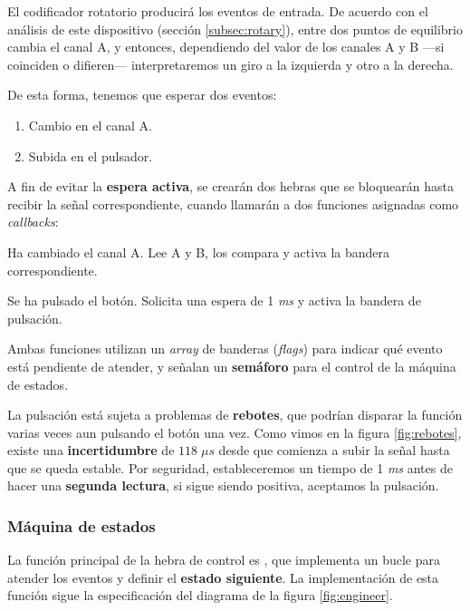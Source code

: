 El codificador rotatorio producirá los eventos de entrada. De acuerdo con el análisis de este dispositivo (sección \ref{subsec:rotary}), entre dos puntos de equilibrio cambia el canal A, y entonces, dependiendo del valor de los canales A y B ---si coinciden o difieren--- interpretaremos un giro a la izquierda y otro a la derecha.

De esta forma, tenemos que esperar dos eventos:

\begin{enumerate}
	\item Cambio en el canal A.
	\item Subida en el pulsador.
\end{enumerate}
	
A fin de evitar la \textbf{espera activa}, se crearán dos hebras que se bloquearán hasta recibir la señal correspondiente, cuando llamarán a dos funciones asignadas como \textit{callbacks}:

\begin{description}[style=nextline]
	\item[rot\_change()] Ha cambiado el canal A. Lee A y B, los compara y activa la bandera correspondiente.
	\item[rot\_push()] Se ha pulsado el botón. Solicita una espera de 1 \textit{ms} y activa la bandera de pulsación.
\end{description}

Ambas funciones utilizan un \textit{array} de banderas (\textit{flags}) para indicar qué evento está pendiente de atender, y señalan un \textbf{semáforo} para el control de la máquina de estados.

La pulsación está sujeta a problemas de \textbf{rebotes}, que podrían disparar la función varias veces aun pulsando el botón una vez. Como vimos en la figura \ref{fig:rebotes}, existe una \textbf{incertidumbre} de $118 \; \mu s$ desde que comienza a subir la señal hasta que se queda estable. Por seguridad, estableceremos un tiempo de 1 \textit{ms} antes de hacer una \textbf{segunda lectura}, si sigue siendo positiva, aceptamos la pulsación.

\subsubsection{Máquina de estados}

La función principal de la hebra de control es , que implementa un bucle para atender los eventos y definir el \textbf{estado siguiente}. La implementación de esta función sigue la especificación del diagrama de la figura \ref{fig:engineer}.

